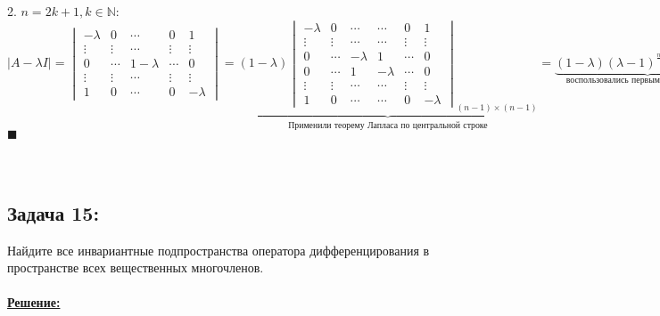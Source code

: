 \documentclass[a4paper,12pt,titlepage,final]{article}
\begin{document}
2. $n = 2k + 1, k \in \mathbb{N}$: \\
$|A - \lambda I| = 
\begin{vmatrix}
    -\lambda & 0 & \cdots & 0 & 1 \\
    \vdots & \vdots & \cdots & \vdots & \vdots \\ 
    0 & \cdots & 1 -\lambda & \cdots & 0 \\
    \vdots & \vdots & \cdots & \vdots & \vdots \\ 
    1 & 0 & \cdots & 0 & -\lambda
\end{vmatrix} =
\underbrace{(1 - \lambda)
\begin{vmatrix}
    -\lambda & 0 & \cdots & \cdots & 0 & 1 \\
    \vdots & \vdots & \cdots & \cdots & \vdots & \vdots \\ 
    0 & \cdots & -\lambda & 1 & \cdots & 0 \\
    0 & \cdots & 1 & -\lambda & \cdots & 0 \\
    \vdots & \vdots & \cdots & \cdots & \vdots & \vdots \\ 
    1 & 0 & \cdots & \cdots & 0 & -\lambda
\end{vmatrix}_{(n - 1) \times (n - 1)}}_{\text{Применили теорему Лапласа по центральной строке}} = 
\underbrace{(1 - \lambda)(\lambda - 1)^{\frac{n - 1}{2}}(\lambda + 1)^{\frac{n - 1}{2}}}_{\text{воспользовались первым пунктом решения}} = 
-(\lambda - 1)^{\frac{n + 1}{2}}(\lambda + 1)^{\frac{n - 1}{2}}$ \\ $\blacksquare$ \\ \\ \\


\subsection*{Задача 15:}
\noindent Найдите все инвариантные подпространства оператора дифференцирования в пространстве
всех вещественных многочленов. \\ \\
\textbf{\underline{Решение:}} \\


\end{document}
